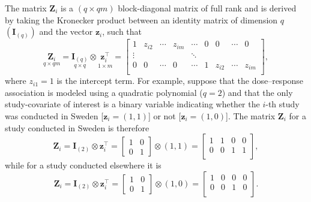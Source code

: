 The matrix $\boldsymbol{Z}_i$ is a $(q \times qm)$ block-diagonal matrix of full rank and is derived by taking the Kronecker product between an identity matrix of dimension $q$ $(\mathbf{I}_{(q)})$ and the vector $\mathbf{z}_i$, such that
\begin{equation*}
\underset{q \times qm}{\mathbf{Z}_i} = \underset{q\times q}{\mathbf{I}_{(q)}} \otimes \underset{1 \times m}{\mathbf{z}_i^\top} = 
	\begin{bmatrix}
		1 & z_{i2} & \cdots & z_{im} & \cdots & 0 & 0 & \cdots & 0 \\
		\vdots &  &  &  & \ddots & &  &  &  \\
		0 & 0 & \cdots & 0 & \cdots & 1 & z_{i2} & \cdots & z_{im} \\
	\end{bmatrix},
\end{equation*}
where $z_{i1} = 1$ is the intercept term. For example, suppose that the dose--response association is modeled using a quadratic polynomial ($q=2$) and that the only study-covariate of interest is a binary variable indicating whether the $i$-th study was conducted in Sweden [$\mathbf{z}_i=(1,1)$] or not [$\mathbf{z}_i=(1,0)$]. The matrix $\mathbf{Z}_i$ for a study conducted in Sweden is therefore
\begin{equation*}
\underset{}{\mathbf{Z}_i} = \underset{}{\mathbf{I}_{(2)}} \otimes \underset{}{\mathbf{z}_i^\top} = 
	\begin{bmatrix}
		1 & 0 \\
		0 & 1
	\end{bmatrix} \otimes
	(1,1)=
	\begin{bmatrix}
		1 & 1  & 0 & 0 \\
		0 & 0 & 1 & 1 \\
	\end{bmatrix},
\end{equation*}
while for a study conducted elsewhere it is
\begin{equation*}
\underset{}{\mathbf{Z}_i} = \underset{}{\mathbf{I}_{(2)}} \otimes \underset{}{\mathbf{z}_i^\top} = 
	\begin{bmatrix}
		1 & 0 \\
		0 & 1
	\end{bmatrix} \otimes
	(1,0)=
	\begin{bmatrix}
		1 & 0  & 0 & 0 \\
		0 & 0 & 1 & 0 \\
	\end{bmatrix}.
\end{equation*}

